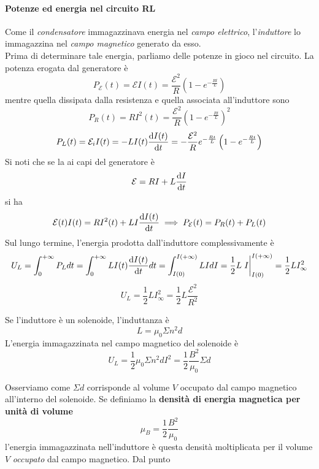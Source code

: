 \paragraph{Potenze ed energia nel circuito RL}
Come il \textit{condensatore} immagazzinava energia nel \textit{campo elettrico}, l'\textit{induttore} lo immagazzina nel \textit{campo magnetico} generato da esso.\\
Prima di determinare tale energia, parliamo delle potenze in gioco nel circuito. La potenza erogata dal generatore è
\begin{equation}
	P_{\mathcal{E}}(t)=\mathcal{E}I(t)=\frac{\mathcal{E}^2}{R}\left(1-e^{-\frac{Rt}{L}}\right)
\end{equation}
mentre quella dissipata dalla resistenza e quella associata all'induttore sono
\begin{equation}
	P_{R}(t)=RI^2(t)=\frac{\mathcal{E}^2}{R}\left(1-e^{-\frac{Rt}{L}}\right)^2
\end{equation}
\begin{equation}
	P_{L}(t)=\mathcal{E}_iI(t)=-LI(t)\dv{I(t)}{t}=-\frac{\mathcal{E}^2}{R}e^{-\frac{Rt}{L}}\left(1-e^{-\frac{Rt}{L}}\right)
\end{equation}
Si noti che se la \ddp ai capi del generatore è
\begin{equation}
	\mathcal{E}=RI+L\dv{I}{t}
\end{equation}
si ha
\begin{equation*}
	\mathcal{E}(t)I(t)=RI^2(t)+LI\dv{I(t)}{t}\implies P_{\mathcal{E}}(t)=P_R(t)+P_L(t)
\end{equation*}
Sul lungo termine, l'energia prodotta dall'induttore complessivamente è
\begin{equation*}
	U_L=\int_0^{+\infty}P_Ldt=\int_0^{+\infty} LI(t)\dv{I(t)}{t}dt=\int_{I(0)}^{I(+\infty)}
	LIdI=\frac{1}{2}L\eval{I}_{I(0)}^{I(+\infty)}=\frac{1}{2}LI_{\infty}^2
\end{equation*}
\begin{equation}
	U_L=\frac{1}{2}L I_{\infty}^2=\frac{1}{2}L\frac{\mathcal{E}^2}{R^2}
\end{equation}
\begin{examplewt}[Solenoide]
	Se l'induttore è un solenoide, l'induttanza è
	\begin{equation*}
		L=\mu_0 \Sigma n^2 d
	\end{equation*}
	L'energia immagazzinata nel campo magnetico del solenoide è
	\begin{equation}
		U_L=\frac{1}{2}\mu_0\Sigma n^2 d  I^2=\frac{1}{2}\frac{B^2}{\mu_0}\Sigma d
	\end{equation}
\end{examplewt}
Osserviamo come $\Sigma d$ corrisponde al volume $V$ occupato dal campo magnetico all'interno del solenoide. Se definiamo la \textbf{densità di energia magnetica per unità di volume}
\begin{equation}\label{DensitàEnergiaMagnetica}
	\mu_{B}=\frac{1}{2}\frac{B^2}{\mu_0}
\end{equation}
l'energia immagazzinata nell'induttore è questa densità moltiplicata per il volume $V$ \textit{occupato} dal campo magnetico. Dal punto
